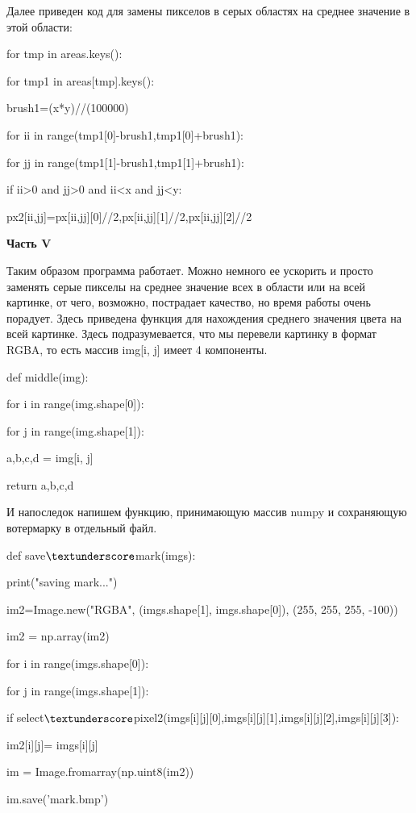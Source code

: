 \documentclass{article}
\newcommand\tab[1][1cm]{\hspace*{#1}}
\begin{document}
Далее приведен код для замены пикселов в серых областях на среднее значение в этой области:

 { 
 for tmp in areas.keys():

\tab[1cm]	for tmp1 in areas[tmp].keys():

\tab[2cm]		brush1=(x*y)//(100000)

\tab[2cm]		for ii in range(tmp1[0]-brush1,tmp1[0]+brush1):

\tab[3cm]			for jj in range(tmp1[1]-brush1,tmp1[1]+brush1):

\tab[4cm]				if ii>0 and jj>0 and ii<x and jj<y:
					
\tab[5cm]					px2[ii,jj]=px[ii,jj][0]//2,px[ii,jj][1]//2,px[ii,jj][2]//2
 
 
 }
 
  \newpage
\begin{center}
{\large\bf Часть V}
\end{center}
 
Таким образом программа работает. Можно немного ее ускорить и просто заменять серые пикселы на среднее значение всех в области или на всей картинке, от чего, возможно, пострадает качество, но время работы очень порадует. Здесь приведена функция для нахождения среднего значения цвета на всей картинке. Здесь подразумевается, что мы перевели картинку в формат RGBA, то есть массив img[i, j] имеет 4 компоненты.
  
 {
 def middle(img):
 
\tab[1cm]   for i in range(img.shape[0]):

\tab[2cm]        for j in range(img.shape[1]):

\tab[3cm]            a,b,c,d = img[i, j]

\tab[1cm]    return a,b,c,d

 }
И напоследок напишем функцию, принимающую массив numpy и сохраняющую вотермарку в отдельный файл. 
  
{  
def save$\textunderscore $mark(imgs):

\tab[1cm]    print("saving mark...")

\tab[1cm]    im2=Image.new("RGBA", (imgs.shape[1], imgs.shape[0]), (255, 255, 255, -100))

\tab[1cm]    im2 = np.array(im2)

\tab[1cm]    for i in range(imgs.shape[0]):

\tab[2cm]        for j in range(imgs.shape[1]):

\tab[3cm] if select$\textunderscore $pixel2(imgs[i][j][0],imgs[i][j][1],imgs[i][j][2],imgs[i][j][3]):

\tab[4cm]                im2[i][j]= imgs[i][j]

\tab[1cm]    im = Image.fromarray(np.uint8(im2))

\tab[1cm]    im.save('mark.bmp')

    }  
  
\end{document}
